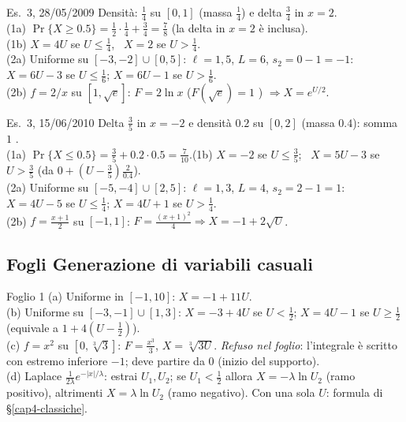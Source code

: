 \begin{esempio}{Es.~3, 28/05/2009}
Densità: $\tfrac14$ su $[0,1]$ (massa $\tfrac14$) e delta $\tfrac34$ in $x=2$.\\
(1a) $\Pr\{X\ge0.5\}=\tfrac12\cdot\tfrac14+\tfrac34=\tfrac78$ (la delta in $x=2$ è inclusa).\\
(1b) $X=4U$ se $U\le\tfrac14$, \ $X=2$ se $U>\tfrac14$.\\
(2a) Uniforme su $[-3,-2]\cup[0,5]$: $\ell=1,5$, $L=6$, $s_2=0-1=-1$:\ $X=6U-3$ se $U\le\tfrac16$; $X=6U-1$ se $U>\tfrac16$.\\
(2b) $f=2/x$ su $[1,\sqrt e]$: $F=2\ln x$ ($F(\sqrt e)=1$ \checkmark) $\Rightarrow X=e^{U/2}$.
\end{esempio}

\begin{esempio}{Es.~3, 15/06/2010}
Delta $\tfrac35$ in $x=-2$ e densità $0.2$ su $[0,2]$ (massa $0.4$): somma $1$ \checkmark.\\
(1a) $\Pr\{X\le0.5\}=\tfrac35+0.2\cdot0.5=\tfrac7{10}$.\quad (1b) $X=-2$ se $U\le\tfrac35$; \ $X=5U-3$ se $U>\tfrac35$ (da $0+(U-\tfrac35)\tfrac{2}{0.4}$).\\
(2a) Uniforme su $[-5,-4]\cup[2,5]$: $\ell=1,3$, $L=4$, $s_2=2-1=1$:\ $X=4U-5$ se $U\le\tfrac14$; $X=4U+1$ se $U>\tfrac14$.\\
(2b) $f=\tfrac{x+1}2$ su $[-1,1]$: $F=\tfrac{(x+1)^2}{4}\Rightarrow X=-1+2\sqrt U$.
\end{esempio}

\subsection*{Fogli \guillemotleft{}Generazione di variabili casuali\guillemotright{}}

\begin{esempio}{Foglio 1}
(a) Uniforme in $[-1,10]$: $X=-1+11U$.\\
(b) Uniforme su $[-3,-1]\cup[1,3]$: $X=-3+4U$ se $U<\tfrac12$; $X=4U-1$ se $U\ge\tfrac12$ (equivale a $1+4(U-\tfrac12)$).\\
(c) $f=x^2$ su $[0,\sqrt[3]3]$: $F=\tfrac{x^3}3$, $X=\sqrt[3]{3U}$. \emph{Refuso nel foglio}: l'integrale è scritto con estremo inferiore $-1$; deve partire da $0$ (inizio del supporto).\\
(d) Laplace $\tfrac1{2\lambda}e^{-|x|/\lambda}$: estrai $U_1,U_2$; se $U_1<\tfrac12$ allora $X=-\lambda\ln U_2$ (ramo positivo), altrimenti $X=\lambda\ln U_2$ (ramo negativo). Con una sola $U$: formula di §\ref{cap4-classiche}.\mio
\end{esempio}

